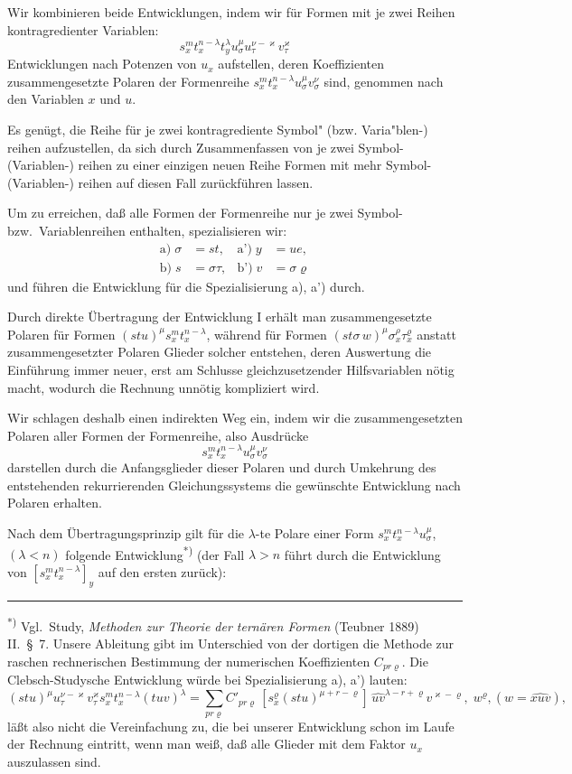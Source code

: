 \documentclass[12pt,a4paper]{article}
\begin{document}
Wir kombinieren beide Entwicklungen, indem wir für Formen mit je zwei
Reihen kontragredienter Variablen:
\[s_x^m t_x^{n-\lambda} t_y^\lambda u_\sigma^\mu u_\tau^{\nu-\varkappa} v_\tau^\varkappa\]
Entwicklungen nach Potenzen von $u_x$ aufstellen, deren Koeffizienten
zusammengesetzte Polaren der Formenreihe $s_x^m t_x^{n-\lambda} u_\sigma^\mu v_\sigma^\nu$
sind, genommen nach den Variablen $x$ und $u$.

Es genügt, die Reihe für je zwei kontragrediente Symbol" (bzw.
Varia"blen-) reihen aufzustellen, da sich durch Zusammenfassen von je zwei
Symbol- (Variablen-) reihen zu einer einzigen neuen Reihe Formen mit mehr
Symbol- (Variablen-) reihen auf diesen Fall zurückführen lassen.

Um zu erreichen, daß alle Formen der Formenreihe nur je zwei
Symbol- bzw.\ Variablenreihen enthalten, spezialisieren wir:
\begin{align*}
\text{a)} \; \sigma &= st, & \text{a')} \; y &= ue,\\
\text{b)} \; s &= \sigma\tau, & \text{b')} \; v &= \sigma\varrho
\end{align*}
und führen die Entwicklung für die Spezialisierung a), a') durch.

Durch direkte Übertragung der Entwicklung I erhält man
zusammengesetzte Polaren für Formen $(stu)^\mu s_x^m t_x^{n-\lambda}$,
während für Formen $(st\sigma\, w)^\mu \sigma_x^\rho \tau_x^\varrho$ anstatt zusammengesetzter Polaren Glieder solcher entstehen, deren Auswertung die Einführung immer neuer,
erst am Schlusse gleichzusetzender Hilfsvariablen nötig macht, wodurch
die Rechnung unnötig kompliziert wird.

Wir schlagen deshalb einen indirekten Weg ein, indem wir die zusammengesetzten Polaren aller Formen der Formenreihe, also Ausdrücke
\[s_x^m t_x^{n-\lambda} u_\sigma^\mu v_\sigma^\nu\]
darstellen durch die Anfangsglieder dieser Polaren und durch Umkehrung
des entstehenden rekurrierenden Gleichungssystems die gewünschte Entwicklung nach Polaren erhalten.

Nach dem Übertragungsprinzip gilt für die $\lambda$-te Polare einer Form
$s_x^m t_x^{n-\lambda} u_\sigma^\mu$, $(\lambda < n)$ folgende Entwicklung\textsuperscript{*)}
(der Fall $\lambda > n$ führt durch die Entwicklung von $[s_x^m t_x^{n-\lambda}]_y$
auf den ersten zurück):

\medskip
\noindent\rule{\textwidth}{0.4pt}
\small
\textsuperscript{*)} Vgl.\ Study, \textit{Methoden zur Theorie der ternären Formen} (Teubner 1889) II.\ §~7.
Unsere Ableitung gibt im Unterschied von der dortigen die Methode zur raschen rechnerischen Bestimmung der numerischen Koeffizienten $C_{pr\varrho}$.
Die Clebsch-Studysche Entwicklung würde bei Spezialisierung a), a') lauten:
\[(stu)^\mu u_\tau^{\nu-\varkappa} v_\tau^\varkappa s_x^m t_x^{n-\lambda} (tuv)^\lambda = \sum_{pr\varrho} C'_{pr\varrho} \, [s_x^\varrho (stu)^{\mu+r-\varrho}] \, \widehat{uv}^{\lambda-r+\varrho} v^{\varkappa-\varrho}, \; w^\varrho, (w = \widehat{xuv}),\]
läßt also nicht die Vereinfachung zu, die bei unserer Entwicklung schon im Laufe der
Rechnung eintritt, wenn man weiß, daß alle Glieder mit dem Faktor $u_x$ auszulassen sind.
\end{document}
